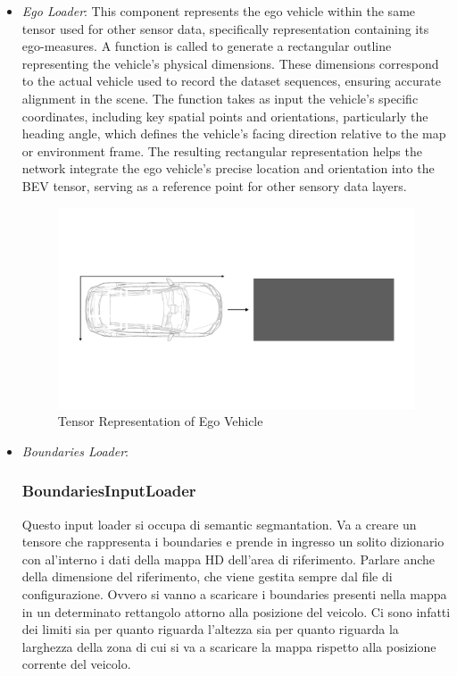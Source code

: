 \begin{itemize}
    \item \textit{Ego Loader}: This component represents the ego vehicle within the same tensor used for other sensor data, specifically representation containing its ego-measures. A function is called to generate a rectangular outline representing the vehicle's physical dimensions. These dimensions correspond to the actual vehicle used to record the dataset sequences, ensuring accurate alignment in the scene. 
    The function takes as input the vehicle's specific coordinates, including key spatial points and orientations, particularly the heading angle, which defines the vehicle's facing direction relative to the map or environment frame. The resulting rectangular representation helps the network integrate the ego vehicle's precise location and orientation into the BEV tensor, serving as a reference point for other sensory data layers.
    \begin{figure}[H]
        \centering
        \includegraphics[width=0.75\linewidth]{LateX//figs/egoLoader.pdf}
        \caption{Tensor Representation of Ego Vehicle}
        \label{fig:ego-loader}
    \end{figure}

    \item \textit{Boundaries Loader}: 
\subsubsection{BoundariesInputLoader}
Questo input loader si occupa di semantic segmantation. Va a creare un tensore che rappresenta i boundaries e prende in ingresso un solito dizionario con al'interno i dati della mappa HD dell'area di riferimento. Parlare anche della dimensione del riferimento, che viene gestita sempre dal file di configurazione. 
Ovvero si vanno a scaricare i boundaries presenti nella mappa in un determinato rettangolo attorno alla posizione del veicolo. Ci sono infatti dei limiti sia per quanto riguarda l'altezza sia per quanto riguarda la larghezza della zona di cui si va a scaricare la mappa rispetto alla posizione corrente del veicolo. 


\end{itemize}
